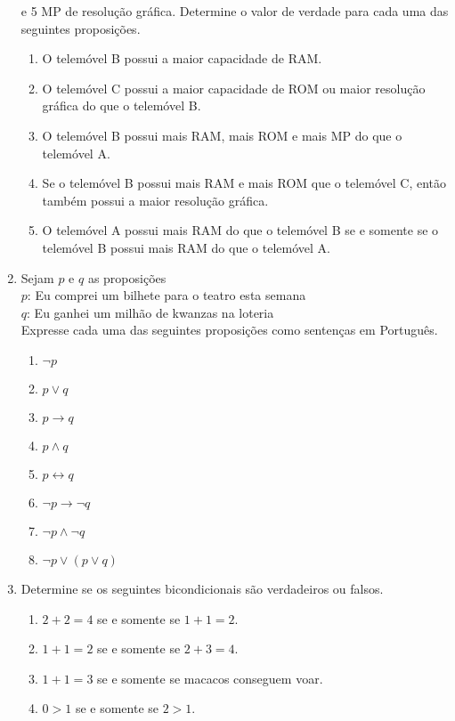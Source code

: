 \begin{enumerate}
  	e 5 MP de resolução gráfica. Determine o valor de verdade para cada uma das seguintes proposições.
  	\begin{enumerate}
  		 \item O telemóvel B possui a maior capacidade de RAM.
  		 \item O telemóvel C possui a maior capacidade de ROM ou maior resolução gráfica do que o telemóvel B.
  		 \item O telemóvel B possui mais RAM, mais ROM e mais MP do que o telemóvel A.
  		 \item Se o telemóvel B possui mais RAM e mais ROM que o telemóvel C, então também possui a maior resolução gráfica.
  		 \item O telemóvel A possui mais RAM do que o telemóvel B se e somente se o telemóvel B possui mais RAM do que o telemóvel A.
	\end{enumerate}
	\item Sejam $p$ e $q$ as proposições\\
	\hspace*{1em}$p$: Eu comprei um bilhete para o teatro esta semana\\
	\hspace*{1em}$q$: Eu ganhei um milhão de kwanzas na loteria\\
	Expresse cada uma das seguintes proposições como sentenças em Português.
	\begin{enumerate}
		  \item $\lnot p$
		  \item $p \lor q$
		  \item $p \to q$
		  \item $p \land q$
		  \item $p \leftrightarrow q$
		  \item $\lnot p \to \lnot q$
		  \item $\lnot p \land \lnot q$
		  \item $\lnot p \lor (p \lor q)$
  	\end{enumerate}
  	\item Determine se os seguintes bicondicionais são verdadeiros ou falsos.
  	\begin{enumerate}
  		\item $2+2=4$ se e somente se $1+1=2$.
  		\item $1+1=2$ se e somente se $2+3=4$.
  		\item $1+1=3$ se e somente se macacos conseguem voar.
  		\item $0 > 1$ se e somente se $2>1$.
	\end{enumerate}

\end{enumerate}
